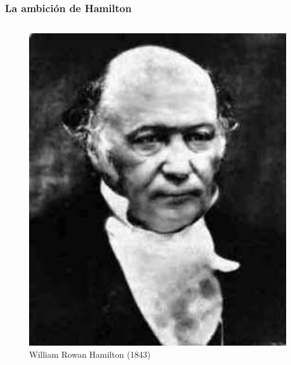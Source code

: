 \documentclass{beamer}
\begin{document}
\begin{frame}
    \frametitle{La ambición de Hamilton}
    \begin{columns}
        \begin{center}
            \begin{figure}
            \includegraphics[scale=0.4]{../gfx/hamilton}
                \caption{William Rowan Hamilton (1843)}
            \end{figure}
        \end{center}
    \end{columns}
\end{frame}
\end{document}
